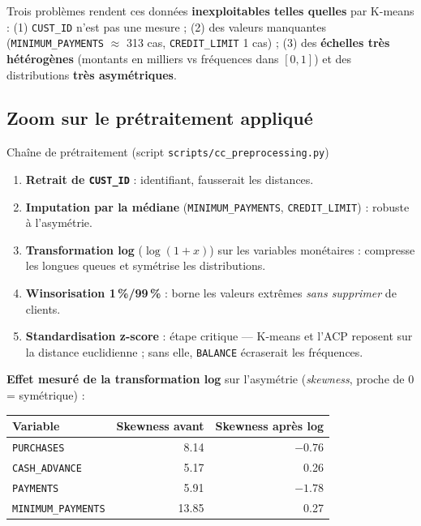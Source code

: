 \documentclass[11pt,a4paper]{article}
\begin{document}
\begin{attention}
Trois problèmes rendent ces données \textbf{inexploitables telles quelles} par
K-means : (1) \texttt{CUST\_ID} n'est pas une mesure ; (2) des valeurs manquantes
(\texttt{MINIMUM\_PAYMENTS} $\approx$ 313 cas, \texttt{CREDIT\_LIMIT} 1 cas) ;
(3) des \textbf{échelles très hétérogènes} (montants en milliers vs fréquences
dans $[0,1]$) et des distributions \textbf{très asymétriques}.
\end{attention}

\subsection{Zoom sur le prétraitement appliqué}

\begin{regle}{Chaîne de prétraitement (script \texttt{scripts/cc\_preprocessing.py})}
\begin{enumerate}[leftmargin=*]
  \item \textbf{Retrait de \texttt{CUST\_ID}} : identifiant, fausserait les distances.
  \item \textbf{Imputation par la médiane} (\texttt{MINIMUM\_PAYMENTS},
        \texttt{CREDIT\_LIMIT}) : robuste à l'asymétrie.
  \item \textbf{Transformation log} ($\log(1+x)$) sur les variables monétaires :
        compresse les longues queues et symétrise les distributions.
  \item \textbf{Winsorisation 1\,\%/99\,\%} : borne les valeurs extrêmes
        \emph{sans supprimer} de clients.
  \item \textbf{Standardisation z-score} : étape critique --- K-means et l'ACP
        reposent sur la distance euclidienne ; sans elle, \texttt{BALANCE}
        écraserait les fréquences.
\end{enumerate}
\end{regle}

\noindent \textbf{Effet mesuré de la transformation log} sur l'asymétrie
(\emph{skewness}, proche de 0 = symétrique) :

\begin{center}\footnotesize
\begin{tabular}{@{}lrr@{}}
\toprule
\textbf{Variable} & \textbf{Skewness avant} & \textbf{Skewness après log} \\
\midrule
\texttt{PURCHASES} & 8.14 & $-0.76$ \\
\texttt{CASH\_ADVANCE} & 5.17 & 0.26 \\
\texttt{PAYMENTS} & 5.91 & $-1.78$ \\
\texttt{MINIMUM\_PAYMENTS} & 13.85 & 0.27 \\
\bottomrule
\end{tabular}
\end{center}
\end{document}

